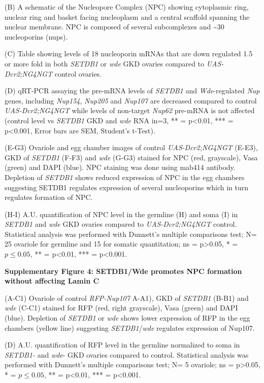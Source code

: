 \documentclass[12pt,oneside]{reedthesis}
\begin{document}
(B) A schematic of the Nucleopore Complex (NPC) showing cytoplasmic
ring, nuclear ring and basket facing nucleoplasm and a central scaffold
spanning the nuclear membrane. NPC is composed of several subcomplexes
and \textasciitilde30 nucleoporins (nups).

(C) Table showing levels of 18 nucleoporin mRNAs that are down regulated
1.5 or more fold in both \emph{SETDB1} or \emph{wde} GKD ovaries compared to
\emph{UAS-Dcr2;NG4NGT} control ovaries.

(D) qRT-PCR assaying the pre-mRNA levels of \emph{SETDB1} and \emph{Wde}-regulated
\emph{Nup} genes, including \emph{Nup154}, \emph{Nup205} and \emph{Nup107} are decreased
compared to control \emph{UAS-Dcr2;NG4NGT} while levels of non-target \emph{Nup62}
pre-mRNA is not affected (control level vs \emph{SETDB1} GKD and \emph{wde} RNA
in=3, ** = p\textless0.01, *** = p\textless0.001, Error bars are SEM, Student's
t-Test).

(E-G3) Ovariole and egg chamber images of control \emph{UAS-Dcr2;NG4NGT}
(E-E3), GKD of \emph{SETDB1} (F-F3) and \emph{wde} (G-G3) stained for NPC (red,
grayscale), Vasa (green) and DAPI (blue). NPC staining was done using
mab414 antibody. Depletion of \emph{SETDB1} shows reduced expression of NPC
in the egg chambers suggesting SETDB1 regulates expression of several
nucleoporins which in turn regulates formation of NPC.

(H-I) A.U. quantification of NPC level in the germline (H) and soma (I)
in \emph{SETDB1} and \emph{wde} GKD ovaries compared to \emph{UAS-Dcr2;NG4NGT} control.
Statistical analysis was performed with Dunnett's multiple comparisons
test; N= 25 ovariole for germline and 15 for somatic quantitation; ns =
p\textgreater0.05, * = \(p \le 0.05\), ** = p\textless0.01, *** = p\textless0.001.

\textbf{Supplementary Figure 4: SETDB1/Wde promotes NPC formation without
affecting Lamin C}

(A-C1) Ovariole of control \emph{RFP-Nup107} A-A1), GKD of \emph{SETDB1} (B-B1)
and \emph{wde} (C-C1) stained for RFP (red, right grayscale), Vasa (green)
and DAPI (blue). Depletion of \emph{SETDB1} or \emph{wde} shows lower expression
of RFP in the egg chambers (yellow line) suggesting \emph{SETDB1}/\emph{wde}
regulates expression of Nup107.

(D) A.U. quantification of RFP level in the germline normalized to soma
in \emph{SETDB1-} and \emph{wde}- GKD ovaries compared to control. Statistical
analysis was performed with Dunnett's multiple comparisons test; N= 5
ovariole; ns = p\textgreater0.05, * = \(p \le 0.05\), ** = p\textless0.01, *** =
p\textless0.001.
\end{document}
